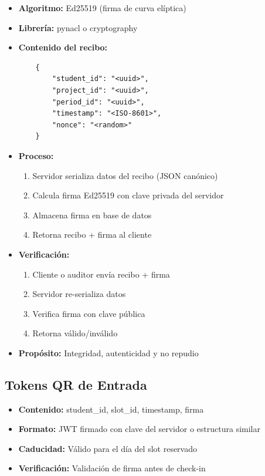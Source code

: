 \documentclass[12pt,a4paper]{article}
\begin{document}
\begin{itemize}[leftmargin=*]
    \item \textbf{Algoritmo:} Ed25519 (firma de curva elíptica)
    \item \textbf{Librería:} pynacl o cryptography
    \item \textbf{Contenido del recibo:}
    \begin{verbatim}
    {
        "student_id": "<uuid>",
        "project_id": "<uuid>",
        "period_id": "<uuid>",
        "timestamp": "<ISO-8601>",
        "nonce": "<random>"
    }
    \end{verbatim}
    \item \textbf{Proceso:}
    \begin{enumerate}
        \item Servidor serializa datos del recibo (JSON canónico)
        \item Calcula firma Ed25519 con clave privada del servidor
        \item Almacena firma en base de datos
        \item Retorna recibo + firma al cliente
    \end{enumerate}
    \item \textbf{Verificación:}
    \begin{enumerate}
        \item Cliente o auditor envía recibo + firma
        \item Servidor re-serializa datos
        \item Verifica firma con clave pública
        \item Retorna válido/inválido
    \end{enumerate}
    \item \textbf{Propósito:} Integridad, autenticidad y no repudio
\end{itemize}

\subsection{Tokens QR de Entrada}

\begin{itemize}[leftmargin=*]
    \item \textbf{Contenido:} student\_id, slot\_id, timestamp, firma
    \item \textbf{Formato:} JWT firmado con clave del servidor o estructura similar
    \item \textbf{Caducidad:} Válido para el día del slot reservado
    \item \textbf{Verificación:} Validación de firma antes de check-in
\end{itemize}
\end{document}
